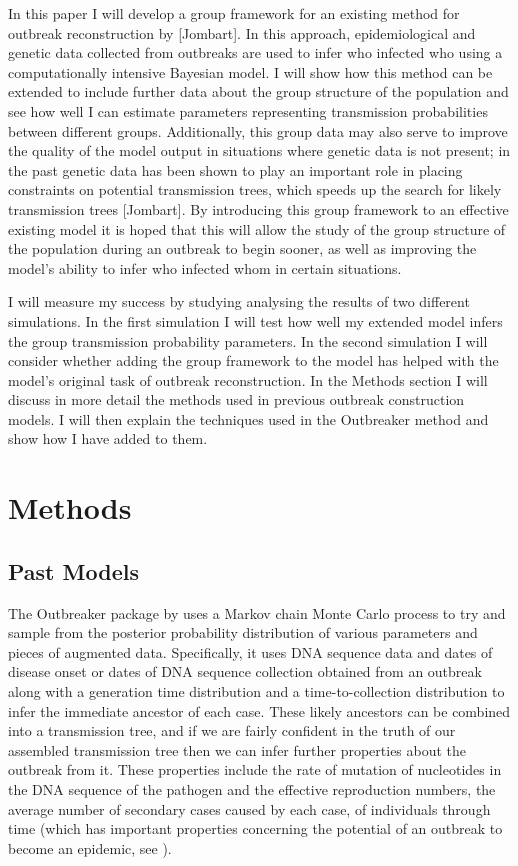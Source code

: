 \documentclass[11pt,a4paper]{report}
\begin{document}
In this paper I will develop a group framework for an existing method for outbreak reconstruction by [Jombart]. In this approach, epidemiological and genetic data collected from outbreaks are used to infer who infected who using a computationally intensive Bayesian model. I will show how this method can be extended to include further data about the group structure of the population and see how well I can estimate parameters representing transmission probabilities between different groups. Additionally, this group data may also serve to improve the quality of the model output in situations where genetic data is not present; in the past genetic data has been shown to play an important role in placing constraints on potential transmission trees, which speeds up the search for likely transmission trees [Jombart]. By introducing this group framework to an effective existing model it is hoped that this will allow the study of the group structure of the population during an outbreak to begin sooner, as well as improving the model's ability to infer who infected whom in certain situations.

I will measure my success by studying analysing the results of two different simulations. In the first simulation I will test how well my extended model infers the group transmission probability parameters. In the second simulation I will consider whether adding the group framework to the model has helped with the model's original task of outbreak reconstruction. In the Methods section I will discuss in more detail the methods used in previous outbreak construction models. I will then explain the techniques used in the Outbreaker method and show how I have added to them. 

\chapter{Methods}

\section{Past Models}
The Outbreaker package by \citet{outbrkr} uses a Markov chain Monte Carlo process to try and sample from the posterior probability distribution of various parameters and pieces of augmented data. Specifically, it uses DNA sequence data and dates of disease onset or dates of DNA sequence collection obtained from an outbreak along with a generation time distribution and a time-to-collection distribution to infer the immediate ancestor of each case. These likely ancestors can be combined into a transmission tree, and if we are fairly confident in the truth of our assembled transmission tree then we can infer further properties about the outbreak from it. These properties include the rate of mutation of nucleotides in the DNA sequence of the pathogen and the effective reproduction numbers, the average number of secondary cases caused by each case, of individuals through time (which has important properties concerning the potential of an outbreak to become an epidemic, see \citet{Grassly08}).
\end{document}
